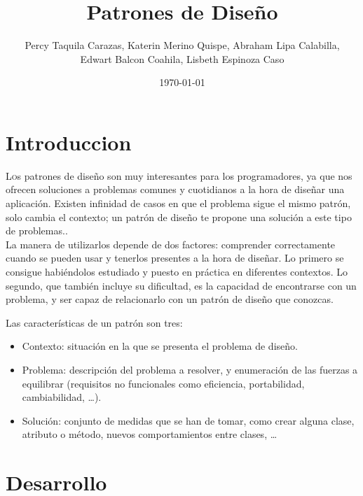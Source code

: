 \documentclass[twoside,twocolumn]{article}
\title{Patrones de Diseño}
\author{Percy Taquila Carazas, Katerin Merino Quispe, Abraham Lipa Calabilla,
\\Edwart Balcon Coahila, Lisbeth Espinoza Caso}
\date{\today}
\begin{document}
\maketitle


\section{Introduccion}

\lettrine[nindent=0em,lines=3]{L}os patrones de diseño son muy interesantes para los programadores, ya que nos ofrecen soluciones a problemas comunes y cuotidianos a la hora de diseñar una aplicación. Existen infinidad de casos en que el problema sigue el mismo patrón, solo cambia el contexto; un patrón de diseño te propone una solución a este tipo de problemas..\\

La manera de utilizarlos depende de dos factores: comprender correctamente cuando se pueden usar y tenerlos presentes a la hora de diseñar. Lo primero se consigue habiéndolos estudiado y puesto en práctica en diferentes contextos. Lo segundo, que también incluye su dificultad, es la capacidad de encontrarse con un problema, y ser capaz de relacionarlo con un patrón de diseño que conozcas.

Las características de un patrón son tres:

\begin{itemize}
\item Contexto: situación en la que se presenta el problema de diseño.
\item Problema: descripción del problema a resolver, y enumeración de las fuerzas a equilibrar (requisitos no funcionales como eficiencia, portabilidad, cambiabilidad, …).
\item Solución: conjunto de medidas que se han de tomar, como crear alguna clase, atributo o método, nuevos comportamientos entre clases, …
\end{itemize}




\section{Desarrollo}
\end{document}
